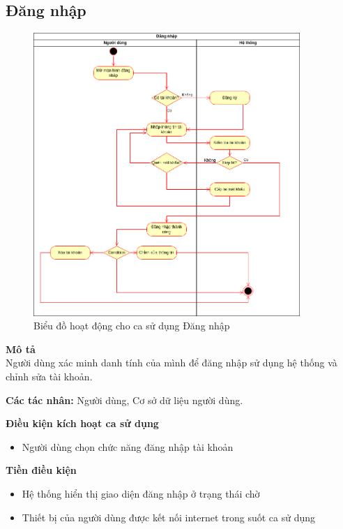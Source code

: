 \subsection{Đăng nhập}
\begin{figure}[H]
    \centering
    \includegraphics[width=0.9\textwidth]{img/Activity_graph-Đăng nhập.drawio.png}
    \caption{Biểu đồ hoạt động cho ca sử dụng Đăng nhập}
\end{figure}
\textbf{\indent Mô tả}\\
\indent Người dùng xác minh danh tính của mình để đăng nhập sử dụng hệ thống và chỉnh sửa tài khoản.

\textbf{Các tác nhân:} Người dùng, Cơ sở dữ liệu người dùng.

\textbf{Điều kiện kích hoạt ca sử dụng}
\begin{itemize}
    \item Người dùng chọn chức năng đăng nhập tài khoản
\end{itemize}

\textbf{Tiền điều kiện}
\begin{itemize}
    \item Hệ thống hiển thị giao diện đăng nhập ở trạng thái chờ
    \item Thiết bị của người dùng được kết nối internet trong suốt ca sử dụng
\end{itemize}

